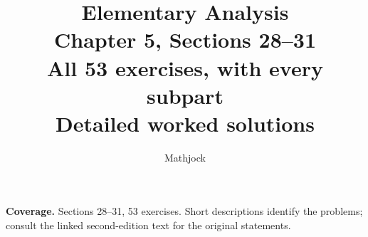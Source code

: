 
\title{\textbf{Elementary Analysis}\\[0.3em]
Chapter 5, Sections 28--31\\[0.4em]
\large All 53 exercises, with every subpart\\
Detailed worked solutions}
\author{Mathjock}
\date{}

\maketitle
\bookinfo
\par\textbf{Coverage.} Sections 28--31, 53 exercises. Short descriptions identify the problems; consult the linked second-edition text for the original statements.
\tableofcontents
\clearpage
\setcounter{section}{27}

\clearpage

\clearpage

\clearpage


